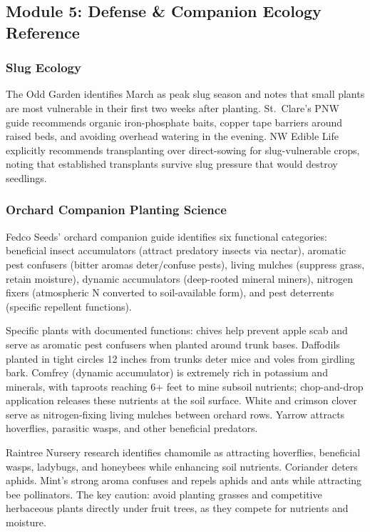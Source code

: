 \documentclass[11pt,letterpaper]{article}
\begin{document}
\subsection{Module 5: Defense \& Companion Ecology Reference}

\subsubsection{Slug Ecology}

The Odd Garden identifies March as peak slug season and notes that small plants are most vulnerable in their first two weeks after planting. St.\ Clare's PNW guide recommends organic iron-phosphate baits, copper tape barriers around raised beds, and avoiding overhead watering in the evening. NW Edible Life explicitly recommends transplanting over direct-sowing for slug-vulnerable crops, noting that established transplants survive slug pressure that would destroy seedlings.

\subsubsection{Orchard Companion Planting Science}

Fedco Seeds' orchard companion guide identifies six functional categories: beneficial insect accumulators (attract predatory insects via nectar), aromatic pest confusers (bitter aromas deter/confuse pests), living mulches (suppress grass, retain moisture), dynamic accumulators (deep-rooted mineral miners), nitrogen fixers (atmospheric N converted to soil-available form), and pest deterrents (specific repellent functions).

Specific plants with documented functions: chives help prevent apple scab and serve as aromatic pest confusers when planted around trunk bases. Daffodils planted in tight circles 12 inches from trunks deter mice and voles from girdling bark. Comfrey (dynamic accumulator) is extremely rich in potassium and minerals, with taproots reaching 6+ feet to mine subsoil nutrients; chop-and-drop application releases these nutrients at the soil surface. White and crimson clover serve as nitrogen-fixing living mulches between orchard rows. Yarrow attracts hoverflies, parasitic wasps, and other beneficial predators.

Raintree Nursery research identifies chamomile as attracting hoverflies, beneficial wasps, ladybugs, and honeybees while enhancing soil nutrients. Coriander deters aphids. Mint's strong aroma confuses and repels aphids and ants while attracting bee pollinators. The key caution: avoid planting grasses and competitive herbaceous plants directly under fruit trees, as they compete for nutrients and moisture.
\end{document}
